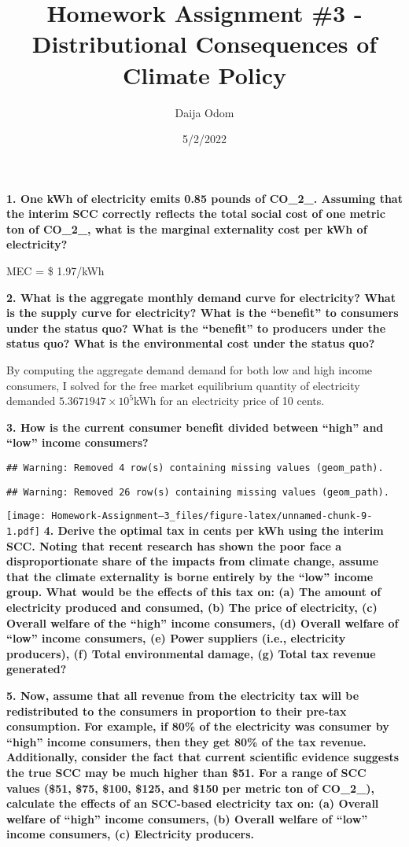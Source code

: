 \documentclass[
]{article}
\title{Homework Assignment \#3 - Distributional Consequences of Climate
Policy}
\author{Daija Odom}
\date{5/2/2022}
\begin{document}
\maketitle

\textbf{1. One kWh of electricity emits 0.85 pounds of CO\_2\_. Assuming
that the interim SCC correctly reflects the total social cost of one
metric ton of CO\_2\_, what is the marginal externality cost per kWh of
electricity?}

MEC = \$ 1.97/kWh

\textbf{2. What is the aggregate monthly demand curve for electricity?
What is the supply curve for electricity? What is the ``benefit'' to
consumers under the status quo? What is the ``benefit'' to producers
under the status quo? What is the environmental cost under the status
quo?}

By computing the aggregate demand demand for both low and high income
consumers, I solved for the free market equilibrium quantity of
electricity demanded \ensuremath{5.3671947\times 10^{5}}kWh for an
electricity price of 10 cents.

\textbf{3. How is the current consumer benefit divided between ``high''
and ``low'' income consumers?}

\begin{verbatim}
## Warning: Removed 4 row(s) containing missing values (geom_path).
\end{verbatim}

\begin{verbatim}
## Warning: Removed 26 row(s) containing missing values (geom_path).
\end{verbatim}

\texttt{[image: Homework-Assignment--3\_files/figure-latex/unnamed-chunk-9-1.pdf]}
\textbf{4. Derive the optimal tax in cents per kWh using the interim
SCC. Noting that recent research has shown the poor face a
disproportionate share of the impacts from climate change, assume that
the climate externality is borne entirely by the ``low'' income group.
What would be the effects of this tax on: (a) The amount of electricity
produced and consumed, (b) The price of electricity, (c) Overall welfare
of the ``high'' income consumers, (d) Overall welfare of ``low'' income
consumers, (e) Power suppliers (i.e., electricity producers), (f) Total
environmental damage, (g) Total tax revenue generated? }

\textbf{5. Now, assume that all revenue from the electricity tax will be
redistributed to the consumers in proportion to their pre-tax
consumption. For example, if 80\% of the electricity was consumer by
``high'' income consumers, then they get 80\% of the tax revenue.
Additionally, consider the fact that current scientific evidence
suggests the true SCC may be much higher than \$51. For a range of SCC
values (\$51, \$75, \$100, \$125, and \$150 per metric ton of CO\_2\_),
calculate the effects of an SCC-based electricity tax on: (a) Overall
welfare of ``high'' income consumers, (b) Overall welfare of ``low''
income consumers, (c) Electricity producers.}
\end{document}
